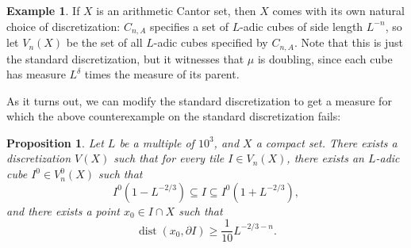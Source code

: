 \documentclass[reqno,12pt]{amsart}
\DeclareMathOperator{\dist}{dist}
\newtheorem{proposition}[theorem]{Proposition}
\theoremstyle{definition}
\newtheorem{example}[theorem]{Example}
\numberwithin{equation}{section}
\begin{document}
\begin{example}
    If $X$ is an arithmetic Cantor set, then $X$ comes with its own natural choice of discretization: $C_{n, A}$ specifies a set of $L$-adic cubes of side length $L^{-n}$, so let $V_n(X)$ be the set of all $L$-adic cubes specified by $C_{n, A}$.
    Note that this is just the standard discretization, but it witnesses that $\mu$ is doubling, since each cube has measure $L^\delta$ times the measure of its parent.
\end{example}

As it turns out, we can modify the standard discretization to get a measure for which the above counterexample on the standard discretization fails:

\begin{proposition}
Let $L$ be a multiple of $10^3$, and $X$ a compact set.
There exists a discretization $V(X)$ such that for every tile $I \in V_n(X)$, there exists an $L$-adic cube $I^0 \in V^0_n(X)$ such that 
$$I^0 (1 - L^{-2/3}) \subseteq I \subseteq I^0 (1 + L^{-2/3}),$$
and there exists a point $x_0 \in I \cap X$ such that 
$$\dist(x_0, \partial I) \geq \frac{1}{10} L^{-2/3-n}.$$
\end{proposition}
\end{document}
